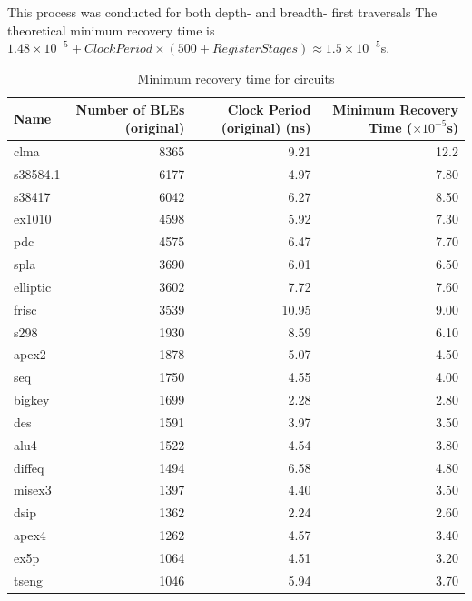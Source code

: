 \documentclass[12pt,final,oneside]{dwThesis} %
\begin{document}
    This process was conducted for both depth- and breadth- first traversals
    The theoretical minimum recovery time is $1.48\times10^{-5}+ClockPeriod\times(500+RegisterStages) \approx 1.5\times10^{-5}$s.
    
   \begin{table}
   \begin{center}
   \begin{tabularx}{0.8\textwidth}{lRRR}
    Name &  Number of BLEs (original) &  Clock Period (original) (ns) & Minimum Recovery Time ($\times10^{-5}$s)\\
  \midrule
clma & 8365 & 9.21 & 12.2\\
s38584.1 & 6177 & 4.97 & 7.80\\
s38417 & 6042 & 6.27 & 8.50\\
ex1010 & 4598 & 5.92 & 7.30\\
pdc & 4575 & 6.47 & 7.70\\
spla & 3690 & 6.01 & 6.50\\
elliptic & 3602 & 7.72 & 7.60\\
frisc & 3539 & 10.95 & 9.00\\
s298 & 1930 & 8.59 & 6.10\\
apex2 & 1878 & 5.07 & 4.50\\
seq & 1750 & 4.55 & 4.00\\
bigkey & 1699 & 2.28 & 2.80\\
des & 1591 & 3.97 & 3.50\\
alu4 & 1522 & 4.54 & 3.80\\
diffeq & 1494 & 6.58 & 4.80\\
misex3 & 1397 & 4.40 & 3.50\\
dsip & 1362 & 2.24 & 2.60\\
apex4 & 1262 & 4.57 & 3.40\\
ex5p & 1064 & 4.51 & 3.20\\
tseng & 1046 & 5.94 & 3.70\\
   	\bottomrule
   \end{tabularx}
   \caption{Minimum recovery time for circuits}\label{minrec}
   \end{center}
   \end{table}
\end{document}
